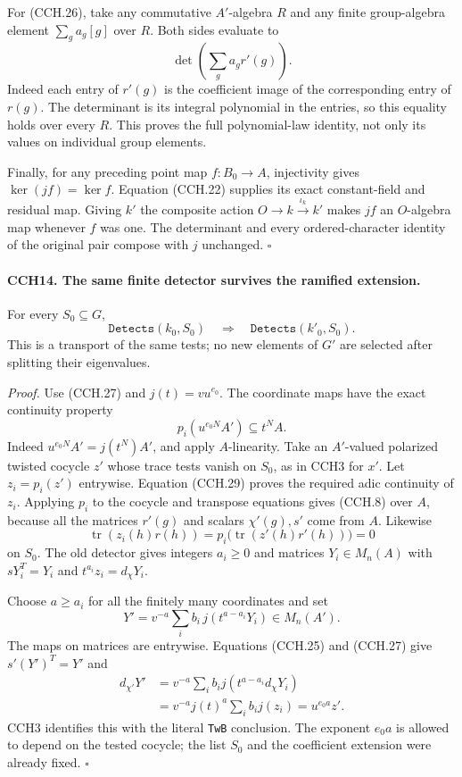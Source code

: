 For (CCH.26), take any commutative $A'$-algebra $R$ and any
finite group-algebra element $\sum_g a_g[g]$ over $R$.
Both sides evaluate to
\[
                         \det\left(\sum_g a_g r'(g)\right).
\]
Indeed each entry of $r'(g)$ is the coefficient image of
the corresponding entry of $r(g)$.  The determinant is
its integral polynomial in the entries, so this equality
holds over every $R$.  This proves the full polynomial-law
identity, not only its values on individual group elements.

Finally, for any preceding point map $f:B_0\to A$,
injectivity gives $\ker(jf)=\ker f$.
Equation (CCH.22) supplies its exact constant-field and
residual map.  Giving $k'$ the composite action
$O\to k\xrightarrow{\iota_k}k'$ makes $jf$ an
$O$-algebra map whenever $f$ was one.  The determinant and
every ordered-character identity of the original pair
compose with $j$ unchanged.
\hfill$\square$

\paragraph{CCH14. The same finite detector survives the ramified extension.}
\label{claim:CCH14}
For every $S_0\subseteq G$,
\[
 \texttt{Detects}(k_0,S_0)\quad\Longrightarrow\quad
                         \texttt{Detects}(k'_0,S_0).
 \tag{CCH.28}
\]
This is a transport of the same tests; no new elements of
$G'$ are selected after splitting their eigenvalues.

\emph{Proof.}
Use (CCH.27) and $j(t)=vu^{e_0}$.
The coordinate maps have the exact continuity property
\[
               p_i(u^{e_0N}A')\subseteq t^NA.
 \tag{CCH.29}
\]
Indeed $u^{e_0N}A'=j(t^N)A'$, and apply $A$-linearity.
Take an $A'$-valued polarized twisted cocycle $z'$ whose
trace tests vanish on $S_0$, as in CCH3 for $x'$.
Let $z_i=p_i(z')$ entrywise.  Equation (CCH.29) proves
the required adic continuity of $z_i$.  Applying $p_i$ to
the cocycle and transpose equations gives (CCH.8) over $A$,
because all the matrices $r'(g)$ and scalars $\chi'(g),s'$
come from $A$.  Likewise
\[
 \operatorname{tr}(z_i(h)r(h))
                  =p_i\bigl(\operatorname{tr}(z'(h)r'(h))\bigr)=0
\]
on $S_0$.  The old detector gives integers $a_i\ge0$ and
matrices $Y_i\in M_n(A)$ with
$sY_i^T=Y_i$ and $t^{a_i}z_i=d_\chi Y_i$.

Choose $a\ge a_i$ for all the finitely many coordinates and set
\[
 Y'=v^{-a}\sum_i b_i\,j(t^{a-a_i}Y_i)\in M_n(A').
 \tag{CCH.30}
\]
The maps on matrices are entrywise.  Equations
(CCH.25) and (CCH.27) give $s'(Y')^T=Y'$ and
\[
 \begin{split}
 d_{\chi'}Y'
 &=v^{-a}\sum_i b_i j(t^{a-a_i}d_\chi Y_i)\\
 &=v^{-a}j(t)^a\sum_i b_i j(z_i)
   =u^{e_0a}z'.
 \end{split}                                           \tag{CCH.31}
\]
CCH3 identifies this with the literal \texttt{TwB} conclusion.
The exponent $e_0a$ is allowed to depend on the tested cocycle;
the list $S_0$ and the coefficient extension were already fixed.
\hfill$\square$

